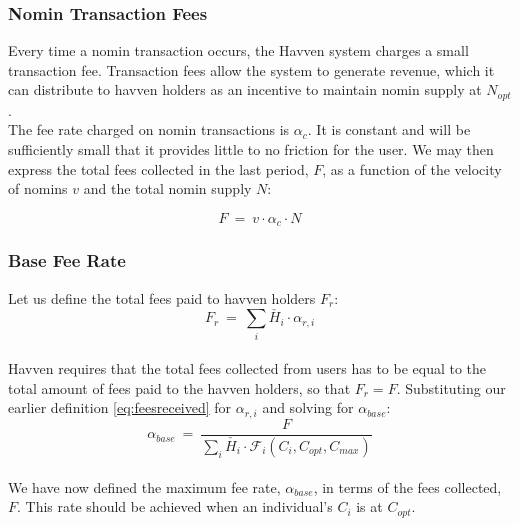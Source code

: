 \newpage

\subsubsection{Nomin Transaction Fees}
Every time a nomin transaction occurs, the Havven system charges a small transaction fee.
Transaction fees allow the system to generate revenue, which it can distribute to havven holders
as an incentive to maintain nomin supply at $N_{opt}$. \\

\noindent The fee rate charged on nomin transactions is $\alpha_c$. It is constant and will be
sufficiently small that it provides little to no friction for the user. We may then express the total fees collected in the last period, $F$, as a function
of the velocity of nomins $v$ and the total nomin supply $N$:

\begin{equation}
    F \ = \ v \cdot \alpha_c \cdot N
\end{equation}

\subsubsection{Base Fee Rate}

Let us define the total fees paid to havven holders $F_{r}$: \\

\begin{equation}
F_{r} \ = \ \sum_{i} \check{H_{i}} \cdot \alpha_{r,i} \label{eq:totalfeesreceived}
\end{equation} \\

\noindent Havven requires that the total fees collected from users has to be equal to the total amount of
fees paid to the havven holders, so that $F_{r} = F$. Substituting our earlier definition \eqref{eq:feesreceived} for $\alpha_{r,i}$ and solving for $\alpha_{base} $: \\

\begin{equation}
\alpha_{base} \ = \ \frac{F}{\sum_{i} \check{H_{i}} \cdot \mathcal{F}_{i}(C_{i}, C_{opt}, C_{max})} \label{eq:10}
\end{equation} \\

\noindent We have now defined the maximum fee rate, $\alpha_{base}$, in terms of the fees collected, $F$. This rate should be achieved when an individual's $C_i$ is at $C_{opt}$. \\

